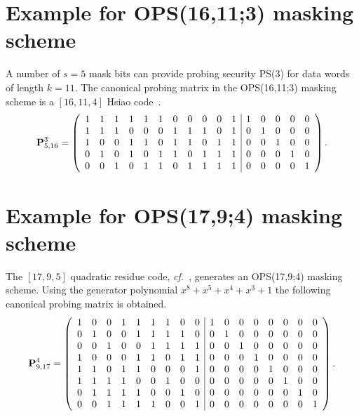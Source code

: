 \documentclass[11pt]{llncs}
\newcommand{\BE}{\begin{equation}}      \newcommand{\EE}{\end{equation}}
\newcommand{\cf}{{\it cf.\ }}
\begin{document}
\section{Example for OPS(16,11;3) masking scheme}\label{App:OPS_Example2}
A number of $s=5$ mask bits can provide probing security PS(3) for data words
of length $k=11$. The canonical probing matrix in the OPS(16,11;3)
masking scheme is a $[16,11,4]$ Hsiao code~\cite{Hsiao1970ClassofOptimal}.
\BE
\V P^3_{5,16} =
\left(\begin{array}{ccccccccccc|ccccc}
 1 & 1 & 1 & 1 & 1 & 1 & 0 & 0 & 0 & 0 & 1  &  1 & 0 & 0 & 0 & 0 \\
 1 & 1 & 1 & 0 & 0 & 0 & 1 & 1 & 1 & 0 & 1  &  0 & 1 & 0 & 0 & 0 \\
 1 & 0 & 0 & 1 & 1 & 0 & 1 & 1 & 0 & 1 & 1  &  0 & 0 & 1 & 0 & 0 \\
 0 & 1 & 0 & 1 & 0 & 1 & 1 & 0 & 1 & 1 & 1  &  0 & 0 & 0 & 1 & 0 \\
 0 & 0 & 1 & 0 & 1 & 1 & 0 & 1 & 1 & 1 & 1  &  0 & 0 & 0 & 0 & 1
\end{array}\right).
\EE

\section{Example for OPS(17,9;4) masking scheme}\label{App:OPS_Example3}
The $[17,9,5]$ quadratic residue code,
\cf\cite{MacWilliams2006TheoryofError-Correcting},
generates an OPS(17,9;4) masking scheme.
Using the generator polynomial $x^8+x^5+x^4+x^3+1$ the following
canonical probing matrix is obtained.
\BE
\V P^4_{9,17} =
\left(\begin{array}{ccccccccc|cccccccc}
 1 & 0 & 0 & 1 & 1 & 1 & 1 & 0 & 0 &  1 & 0 & 0 & 0 & 0 & 0 & 0 & 0 \\
 0 & 1 & 0 & 0 & 1 & 1 & 1 & 1 & 0 &  0 & 1 & 0 & 0 & 0 & 0 & 0 & 0 \\
 0 & 0 & 1 & 0 & 0 & 1 & 1 & 1 & 1 &  0 & 0 & 1 & 0 & 0 & 0 & 0 & 0 \\
 1 & 0 & 0 & 0 & 1 & 1 & 0 & 1 & 1 &  0 & 0 & 0 & 1 & 0 & 0 & 0 & 0 \\
 1 & 1 & 0 & 1 & 1 & 0 & 0 & 0 & 1 &  0 & 0 & 0 & 0 & 1 & 0 & 0 & 0 \\
 1 & 1 & 1 & 1 & 0 & 0 & 1 & 0 & 0 &  0 & 0 & 0 & 0 & 0 & 1 & 0 & 0 \\
 0 & 1 & 1 & 1 & 1 & 0 & 0 & 1 & 0 &  0 & 0 & 0 & 0 & 0 & 0 & 1 & 0 \\
 0 & 0 & 1 & 1 & 1 & 1 & 0 & 0 & 1 &  0 & 0 & 0 & 0 & 0 & 0 & 0 & 1
\end{array}\right).
\EE
\end{document}
